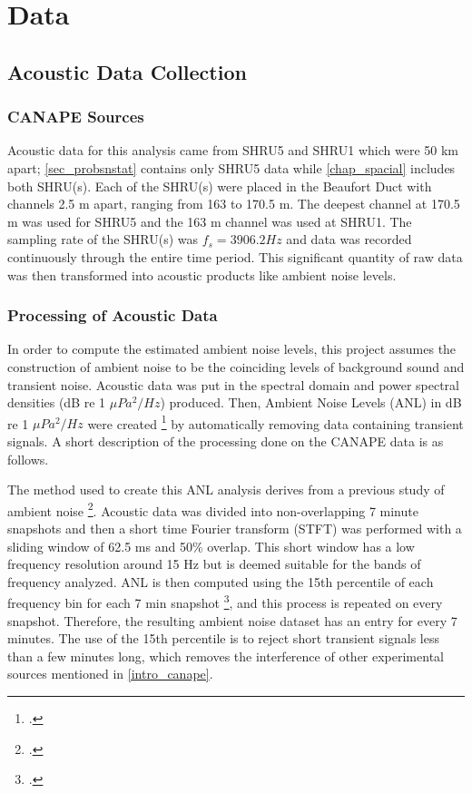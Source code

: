 \section{Data}

\subsection{Acoustic Data Collection} \label{intro_data_col}

\subsubsection{CANAPE Sources}
Acoustic data for this analysis came from SHRU5 and SHRU1 which were 50 km apart; \autoref{sec_probsnstat} contains only SHRU5 data while \autoref{chap_spacial} includes both SHRU(s). Each of the SHRU(s) were placed in the Beaufort Duct with channels 2.5 m apart, ranging from 163 to 170.5 m. The deepest channel at 170.5 m  was used for SHRU5 and the 163 m channel was used at SHRU1. The sampling rate of the SHRU(s) was $f_{s}=3906.2 Hz$ and data was recorded continuously through the entire time period. This significant quantity of raw data was then transformed into acoustic products like ambient noise levels. 


\subsubsection{Processing of Acoustic Data}
In order to compute the estimated ambient noise levels, this project assumes the construction of ambient noise to be the coinciding levels of background sound and transient noise. Acoustic data was put in the spectral domain and power spectral densities (dB re 1 $\mu Pa^{2}/Hz$) produced. Then, Ambient Noise Levels (ANL) in dB re 1 $\mu Pa^{2}/Hz$ were created \footcite[]{carey2011ocean} by automatically removing data containing transient signals. A short description of the processing done on the CANAPE data is as follows.

The method used to create this ANL analysis derives from a previous study of ambient noise \footcite[]{bazile2013under}. Acoustic data was divided into non-overlapping 7 minute snapshots and then a short time Fourier transform (STFT) was performed with a sliding window of 62.5 ms and 50\% overlap. This short window has a low frequency resolution around 15 Hz but is deemed suitable for the bands of frequency analyzed. ANL is then computed using the 15th percentile of each frequency bin for each 7 min snapshot \footcite[]{huillery2008description}, and this process is repeated on every snapshot. Therefore, the resulting ambient noise dataset has an entry for every 7 minutes. The use of the 15th percentile is to reject short transient signals less than a few minutes long, which removes the interference of other experimental sources mentioned in \autoref{intro_canape}.


